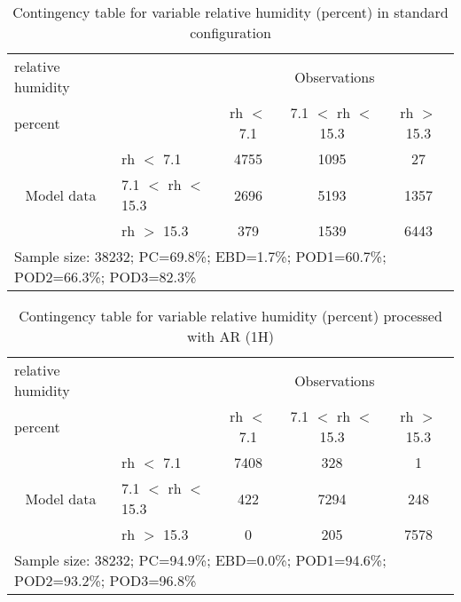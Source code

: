 \documentclass[11pt,english]{article}
\begin{document}
\clearpage
\begin{table}[]
\begin{center}
\begin{tabular}{llccc}
\hline
{relative humidity}                                       &                                                    & \multicolumn{3}{c}{Observations}                 \\
{percent}                                       &                             & rh $<$ 7.1   & 7.1 $<$ rh $<$ 15.3 & rh $>$ 15.3 \\
\hline
\multicolumn{1}{c}{\multirow{3}{*}{Model data}}  & rh $<$ 7.1             & 4755                & 1095                       & 27              \\
                                                 & 7.1  $<$ rh $<$ 15.3 & 2696                & 5193                       & 1357              \\
                                                 & rh $>$ 15.3             & 379                & 1539                       & 6443              \\
\hline
\multicolumn{5}{l}{Sample size: 38232; PC=69.8\%; EBD=1.7\%; POD1=60.7\%; POD2=66.3\%; POD3=82.3\%}
\end{tabular}
\end{center}
\caption{Contingency table for variable relative humidity (percent) in standard configuration}
\label{tab:contingencyrhBEF}
\end{table}
\begin{table}[]
\begin{center}
\begin{tabular}{llccc}
\hline
{relative humidity}                                       &                                                    & \multicolumn{3}{c}{Observations}                 \\
{percent}                                       &                             & rh $<$ 7.1   & 7.1 $<$ rh $<$ 15.3 & rh $>$ 15.3 \\
\hline
\multicolumn{1}{c}{\multirow{3}{*}{Model data}}  & rh $<$ 7.1             & 7408                & 328                       & 1              \\
                                                 & 7.1  $<$ rh $<$ 15.3 & 422                & 7294                       & 248              \\
                                                 & rh $>$ 15.3             & 0                & 205                       & 7578              \\
\hline
\multicolumn{5}{l}{Sample size: 38232; PC=94.9\%; EBD=0.0\%; POD1=94.6\%; POD2=93.2\%; POD3=96.8\%}
\end{tabular}
\end{center}
\caption{Contingency table for variable relative humidity (percent) processed with AR (1H)}
\label{tab:contingencyrhAFT}
\end{table}
\end{document}
